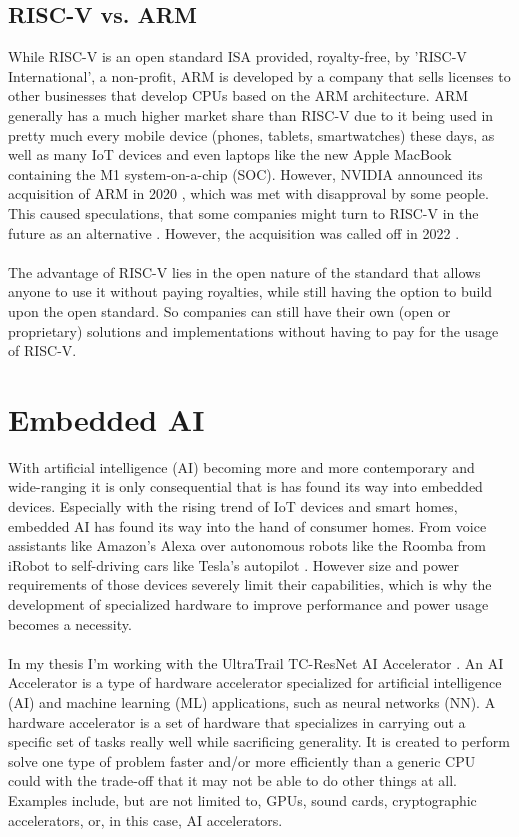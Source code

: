 \subsection{RISC-V vs. ARM}

While RISC-V \cite{riscv} is an open standard ISA provided, royalty-free, by 'RISC-V International', a non-profit,
ARM \cite{arm} is developed by a company that sells licenses to other businesses that develop CPUs based on the ARM architecture.
ARM generally has a much higher market share than RISC-V due to it being used in pretty much every mobile device (phones, tablets, smartwatches)
these days, as well as many IoT devices and even laptops like the new Apple MacBook containing the M1 system-on-a-chip (SOC).
However, NVIDIA announced its acquisition of ARM in 2020 \cite{arm_sale}, which was met with disapproval by some people.
This caused speculations, that some companies might turn to RISC-V in the future as an alternative \cite{arm_sale_speculation}.
However, the acquisition was called off in 2022 \cite{arm_sale_called_off}.\\\\
The advantage of RISC-V lies in the open nature of the standard that allows anyone to use it without paying royalties, while still
having the option to build upon the open standard.
So companies can still have their own (open or proprietary) solutions and implementations \cite{riscv_about} without having to pay for
the usage of RISC-V.

\section{Embedded AI}

With artificial intelligence (AI) becoming more and more contemporary and wide-ranging it is only consequential that is has found its way into embedded devices.
Especially with the rising trend of IoT devices and smart homes, embedded AI has found its way into the hand of consumer homes.
From voice assistants like Amazon's Alexa \cite{alexa} over autonomous robots like the Roomba \cite{roomba} from iRobot to self-driving cars like Tesla's autopilot \cite{autopilot}.
However size and power requirements of those devices severely limit their capabilities, which is why the development of specialized hardware to improve performance
and power usage becomes a necessity.\\\\
In my thesis I'm working with the UltraTrail TC-ResNet AI Accelerator \cite{ultratrail}.
An AI Accelerator is a type of hardware accelerator specialized for artificial intelligence (AI) and machine learning (ML) applications, such as neural networks (NN).
A hardware accelerator is a set of hardware that specializes in carrying out a specific set of tasks really well while sacrificing generality.
It is created to perform solve one type of problem faster and/or more efficiently than a generic CPU could with the trade-off that it may not be able to do other things at all.
Examples include, but are not limited to, GPUs, sound cards, cryptographic accelerators, or, in this case, AI accelerators.\\\\


